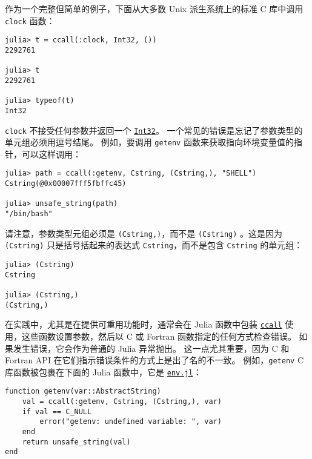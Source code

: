 作为一个完整但简单的例子，下面从大多数 Unix 派生系统上的标准 C 库中调用 \texttt{clock} 函数：




\begin{verbatim}
julia> t = ccall(:clock, Int32, ())
2292761

julia> t
2292761

julia> typeof(t)
Int32
\end{verbatim}



\texttt{clock} 不接受任何参数并返回一个 \hyperlink{10103694114785108551}{\texttt{Int32}}。 一个常见的错误是忘记了参数类型的单元组必须用逗号结尾。 例如，要调用 \texttt{getenv} 函数来获取指向环境变量值的指针，可以这样调用：




\begin{verbatim}
julia> path = ccall(:getenv, Cstring, (Cstring,), "SHELL")
Cstring(@0x00007fff5fbffc45)

julia> unsafe_string(path)
"/bin/bash"
\end{verbatim}



请注意，参数类型元组必须是 \texttt{(Cstring,)}，而不是 \texttt{(Cstring)} 。这是因为 \texttt{(Cstring)} 只是括号括起来的表达式 \texttt{Cstring}，而不是包含 \texttt{Cstring} 的单元组：




\begin{verbatim}
julia> (Cstring)
Cstring

julia> (Cstring,)
(Cstring,)
\end{verbatim}



在实践中，尤其是在提供可重用功能时，通常会在 Julia 函数中包装 \hyperlink{14245046751182637566}{\texttt{ccall}} 使用，这些函数设置参数，然后以 C 或 Fortran 函数指定的任何方式检查错误。 如果发生错误，它会作为普通的 Julia 异常抛出。 这一点尤其重要，因为 C 和 Fortran API 在它们指示错误条件的方式上是出了名的不一致。 例如，\texttt{getenv} C 库函数被包裹在下面的 Julia 函数中，它是 \href{https://github.com/JuliaLang/julia/blob/master/base/env.jl}{\texttt{env.jl}}：




\begin{verbatim}
function getenv(var::AbstractString)
    val = ccall(:getenv, Cstring, (Cstring,), var)
    if val == C_NULL
        error("getenv: undefined variable: ", var)
    end
    return unsafe_string(val)
end
\end{verbatim}



